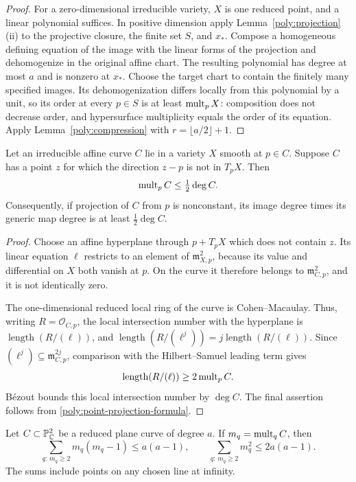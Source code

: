\begin{proof}
For a zero-dimensional irreducible variety, $X$ is one reduced
point, and a linear polynomial suffices.  In positive dimension
apply Lemma~\ref{poly:projection}(ii) to the projective closure,
the finite set $S$, and $x_*$.  Compose a homogeneous defining
equation of the image with the linear forms of the projection and
dehomogenize in the original affine chart.  The resulting polynomial
has degree at most $a$ and is nonzero at $x_*$.  Choose the target
chart to contain the finitely many specified images.  Its
dehomogenization differs locally from this polynomial by a unit,
so its order at every $p\in S$ is at least $\operatorname{mult}_pX$: composition
does not decrease order, and hypersurface multiplicity equals the
order of its equation.  Apply Lemma~\ref{poly:compression} with
$r=\lfloor a/2\rfloor+1$.
\end{proof}

\begin{corollary}
\label{poly:tangent-projection}
Let an irreducible affine curve $C$ lie in a variety $X$ smooth at
$p\in C$.  Suppose $C$ has a point $z$ for which the direction
$z-p$ is not in $T_pX$.  Then
\[
 \operatorname{mult}_pC\le\tfrac12\deg C.
\]
Consequently, if projection of $C$ from $p$ is nonconstant, its
image degree times its generic map degree is at least
$\tfrac12\deg C$.
\end{corollary}

\begin{proof}
Choose an affine hyperplane through $p+T_pX$ which does not contain
$z$.  Its linear equation $\ell$ restricts to an element of
$\mathfrak m_{X,p}^2$, because its value and differential on $X$
both vanish at $p$.  On the curve it therefore belongs to
$\mathfrak m_{C,p}^2$, and it is not identically zero.

The one-dimensional reduced local ring of the curve is
Cohen--Macaulay.  Thus, writing $R=\mathcal O_{C,p}$, the local
intersection number with the hyperplane is
$\operatorname{length}(R/(\ell))$, and
$\operatorname{length}(R/(\ell^j))=
j\operatorname{length}(R/(\ell))$.
Since $(\ell^j)\subseteq\mathfrak m_{C,p}^{2j}$, comparison with
the Hilbert--Samuel leading term gives
\[
 \operatorname{length}(R/(\ell))\ge2\operatorname{mult}_pC.
\]
B\'ezout bounds this local intersection number by $\deg C$.
The final assertion follows from
\eqref{poly:point-projection-formula}.
\end{proof}

\begin{lemma}\label{poly:polar}
Let $C\subset\mathbb P^2_{\mathbb C}$ be a reduced plane curve of degree $a$.
If $m_q=\operatorname{mult}_qC$, then
\begin{equation}\label{poly:polar-sum}
 \sum_{q:\,m_q\ge2}m_q(m_q-1)\le a(a-1),
 \qquad
 \sum_{q:\,m_q\ge2}m_q^2\le2a(a-1).
\end{equation}
The sums include points on any chosen line at infinity.
\end{lemma}


